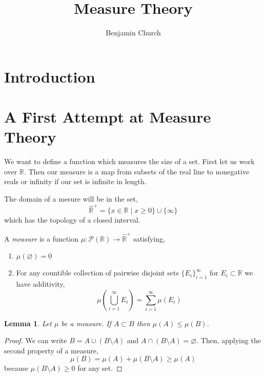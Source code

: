\documentclass{article}
\newcommand{\R}{\mathbb{R}}
\newenvironment{definition}[1][Definition:]{\begin{trivlist}
\item[\hskip \labelsep {\bfseries #1}]}{\end{trivlist}}
\theoremstyle{theorem}
\newtheorem{lemma}[theorem]{Lemma}
\theoremstyle{definition}
\theoremstyle{definition}
\theoremstyle{remark}
\theoremstyle{definition}
\theoremstyle{remark}
\begin{document}
\author{Benjamin Church}
\title{\Huge Measure Theory}

\maketitle
\tableofcontents
\newpage

\newcommand{\Rcomp}{\hat{\R}^+}
\newcommand{\Power}[1]{\mathcal{P}\left( #1 \right)}
\newcommand{\measure}[1]{\mu\left( #1 \right)}
\newcommand{\outmeasure}[1]{\mu^*\left( #1 \right)}

\section{Introduction}

\section{A First Attempt at Measure Theory}

We want to define a function which measures the size of a set. First let us work over $\R$. Then our measure is a map from subsets of the real line to nonegative reals or infinity if our set is infinite in length. 

\begin{definition}
The domain of a mesure will be in the set,
\[ \Rcomp = \{ x \in \R \mid x \ge 0 \} \cup \{ \infty \} \]
which has the topology of a closed interval. 
\end{definition}

\begin{definition}
A \textit{measure} is a function $\mu : \Power{\R} \to \Rcomp$ satisfying,
\begin{enumerate}
\item $\measure{\varnothing} = 0$

\item For any countible collection of pairwise disjoint sets $\{ E_i \}_{i = 1}^{\infty}$ for $E_i \subset \R$ we have additivity,
\[ \measure{\bigcup_{i = 1}^\infty E_i} = \sum_{i = 1}^\infty \measure{E_i} \]
\end{enumerate}
\end{definition}

\begin{lemma}
Let $\mu$ be a measure. If $A \subset B$ then $\measure{A} \le \measure{B}$. 
\end{lemma}

\begin{proof}
We can write $B = A \cup (B \setminus A)$ and $A \cap (B \setminus A) = \varnothing$. Then, applying the second property of a measure,
\[ \measure{B} = \measure{A} + \measure{B \setminus A} \ge \measure{A} \]
because $\measure{B \setminus A} \ge 0$ for any set. 
\end{proof}
\end{document}
